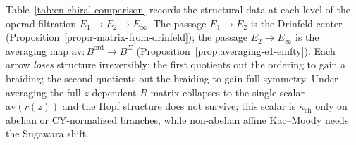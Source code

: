 \begin{remark}
\label{rem:e1-e2-einfty-comparison}
Table~\ref{tab:en-chiral-comparison} records the structural data at
each level of the operad filtration $E_1 \to E_2 \to E_\infty$.
The passage $E_1 \to E_2$ is the Drinfeld center
(Proposition~\ref{prop:r-matrix-from-drinfeld}); the passage
$E_2 \to E_\infty$ is the averaging map
$\mathrm{av} \colon B^{\mathrm{ord}} \to B^{\Sigma}$
(Proposition~\ref{prop:averaging-e1-einfty}).
Each arrow \emph{loses} structure irreversibly: the first quotients out
the ordering to gain a braiding; the second quotients out the braiding
to gain full symmetry. Under averaging the full
$z$-dependent $R$-matrix collapses to the single scalar $\mathrm{av}(r(z))$
and the Hopf structure does not survive; this scalar is
$\kappa_{\mathrm{ch}}$ only on abelian or CY-normalized branches, while
non-abelian affine Kac--Moody needs the Sugawara shift.


\end{remark}
